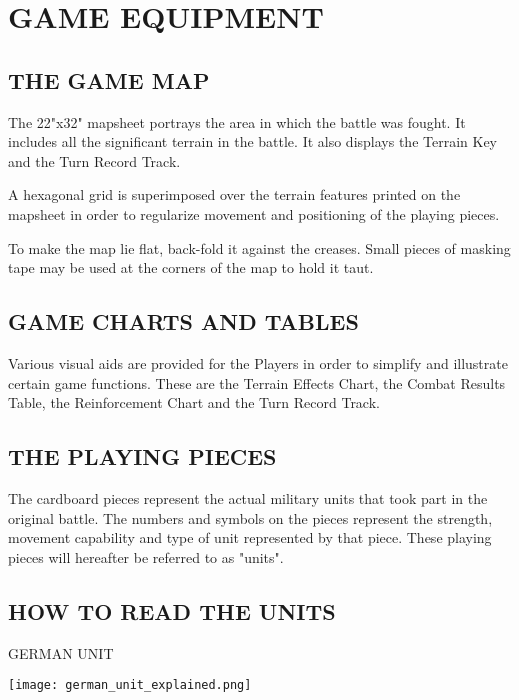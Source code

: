 \section{GAME EQUIPMENT}

\subsection{THE GAME MAP}

The 22"x32" mapsheet portrays the area in which the battle was fought. It includes all the significant terrain in the battle. It also displays the Terrain Key and the Turn Record Track.

A hexagonal grid is superimposed over the terrain features printed on the mapsheet in order to regularize movement and positioning of the playing pieces.

To make the map lie flat, back-fold it against the creases. Small pieces of masking tape may be used at the corners of the map to hold it taut.

\subsection{GAME CHARTS AND TABLES}

Various visual aids are provided for the Players in order to simplify and illustrate certain game functions. These are the Terrain Effects Chart, the Combat Results Table, the Reinforcement Chart and the Turn Record Track.

\subsection{THE PLAYING PIECES}

The cardboard pieces represent the actual military units that took part in the original battle. The numbers and symbols on the pieces represent the strength, movement capability and type of unit represented by that piece. These playing pieces will hereafter be referred to as "units".

\subsection{HOW TO READ THE UNITS}

GERMAN UNIT

\begin{center}
  \texttt{[image: german\_unit\_explained.png]}
\end{center}

